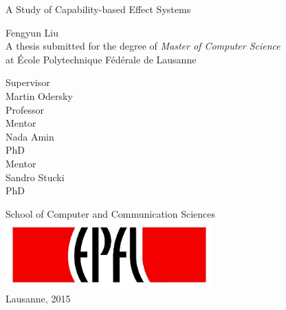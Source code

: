 \begin{titlepage}

  \begin{center}

    \vspace*{3\baselineskip}
    {\Large A Study of Capability-based Effect Systems\\[2cm] }

    \noindent
    Fengyun Liu \\[2cm]

    \noindent
    A thesis submitted for the degree of \emph{Master of Computer
      Science} \\
    at École Polytechnique Fédérale de Lausanne \\[1.8cm]

    \noindent
    \begin{multicols}{3}
    Supervisor \\
    Martin Odersky \\
    Professor \\
    \vfill
    \columnbreak
    Mentor \\
    Nada Amin \\
    PhD \\
    \vfill
    \columnbreak
    Mentor \\
    Sandro Stucki\\
    PhD \\
    \end{multicols}

    \vspace*{3\baselineskip}

    \noindent
    {School of Computer and Communication Sciences \\[1cm]}
    \includegraphics[width=0.6\textwidth]{img/epfl}~\\[1cm]
    \noindent
    Lausanne, 2015 \\[1cm]



  \end{center}

\end{titlepage}
